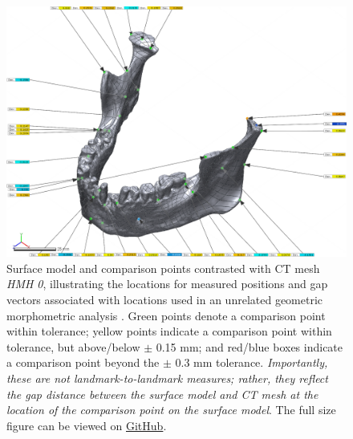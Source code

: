 \documentclass[review]{elsarticle}
\begin{document}
\begin{figure}[!]\centering
\includegraphics[width=\linewidth]{Fig5}
\caption{Surface model and comparison points contrasted with CT mesh \textit{HMH 0}, illustrating the locations for measured positions and gap vectors associated with locations used in an unrelated geometric morphometric analysis \cite[Supplementary Information]{RN11477}. Green points denote a comparison point within tolerance; yellow points indicate a comparison point within tolerance, but above/below $\pm$ 0.15 mm; and red/blue boxes indicate a comparison point beyond the $\pm$ 0.3 mm tolerance. \textit{Importantly, these are not landmark-to-landmark measures; rather, they reflect the gap distance between the surface model and CT mesh at the location of the comparison point on the surface model}. The full size figure can be viewed on \href{https://github.com/aksel-blaise/cai.mandible/blob/main/figures/Fig5.png}{GitHub}.}
\label{fig:Fig5}
\end{figure}
\end{document}
